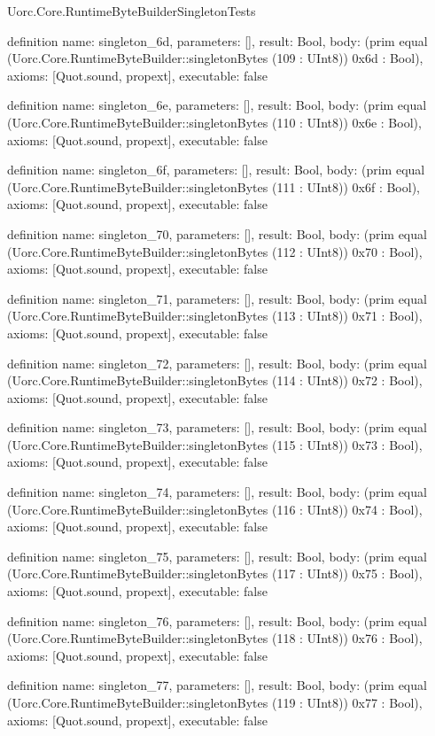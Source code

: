\begin{lexlean}{Uorc.Core.RuntimeByteBuilderSingletonTests}
\begin{semanticmodule}
definition{
  name: singleton_6d,
  parameters: [],
  result: Bool,
  body: (prim equal (Uorc.Core.RuntimeByteBuilder::singletonBytes (109 : UInt8)) 0x6d : Bool),
  axioms: [Quot.sound, propext],
  executable: false
}

definition{
  name: singleton_6e,
  parameters: [],
  result: Bool,
  body: (prim equal (Uorc.Core.RuntimeByteBuilder::singletonBytes (110 : UInt8)) 0x6e : Bool),
  axioms: [Quot.sound, propext],
  executable: false
}

definition{
  name: singleton_6f,
  parameters: [],
  result: Bool,
  body: (prim equal (Uorc.Core.RuntimeByteBuilder::singletonBytes (111 : UInt8)) 0x6f : Bool),
  axioms: [Quot.sound, propext],
  executable: false
}

definition{
  name: singleton_70,
  parameters: [],
  result: Bool,
  body: (prim equal (Uorc.Core.RuntimeByteBuilder::singletonBytes (112 : UInt8)) 0x70 : Bool),
  axioms: [Quot.sound, propext],
  executable: false
}

definition{
  name: singleton_71,
  parameters: [],
  result: Bool,
  body: (prim equal (Uorc.Core.RuntimeByteBuilder::singletonBytes (113 : UInt8)) 0x71 : Bool),
  axioms: [Quot.sound, propext],
  executable: false
}

definition{
  name: singleton_72,
  parameters: [],
  result: Bool,
  body: (prim equal (Uorc.Core.RuntimeByteBuilder::singletonBytes (114 : UInt8)) 0x72 : Bool),
  axioms: [Quot.sound, propext],
  executable: false
}

definition{
  name: singleton_73,
  parameters: [],
  result: Bool,
  body: (prim equal (Uorc.Core.RuntimeByteBuilder::singletonBytes (115 : UInt8)) 0x73 : Bool),
  axioms: [Quot.sound, propext],
  executable: false
}

definition{
  name: singleton_74,
  parameters: [],
  result: Bool,
  body: (prim equal (Uorc.Core.RuntimeByteBuilder::singletonBytes (116 : UInt8)) 0x74 : Bool),
  axioms: [Quot.sound, propext],
  executable: false
}

definition{
  name: singleton_75,
  parameters: [],
  result: Bool,
  body: (prim equal (Uorc.Core.RuntimeByteBuilder::singletonBytes (117 : UInt8)) 0x75 : Bool),
  axioms: [Quot.sound, propext],
  executable: false
}

definition{
  name: singleton_76,
  parameters: [],
  result: Bool,
  body: (prim equal (Uorc.Core.RuntimeByteBuilder::singletonBytes (118 : UInt8)) 0x76 : Bool),
  axioms: [Quot.sound, propext],
  executable: false
}

definition{
  name: singleton_77,
  parameters: [],
  result: Bool,
  body: (prim equal (Uorc.Core.RuntimeByteBuilder::singletonBytes (119 : UInt8)) 0x77 : Bool),
  axioms: [Quot.sound, propext],
  executable: false
}


\end{semanticmodule}
\end{lexlean}
